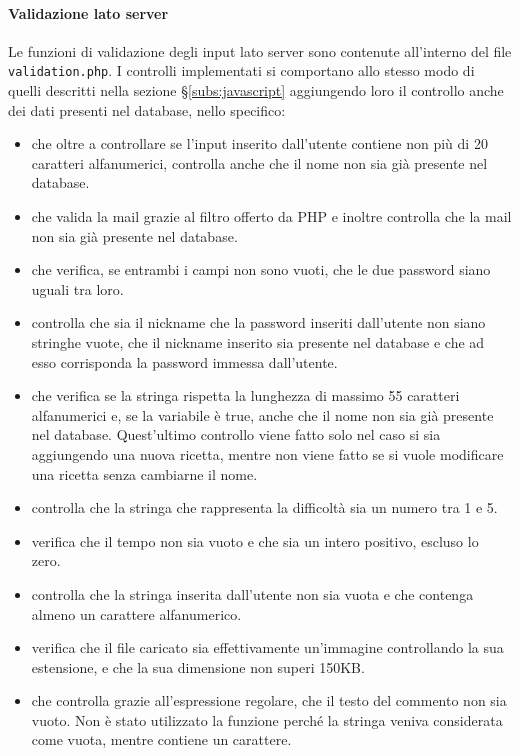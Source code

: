\paragraph{Validazione lato server}\label{par:validazione_lato_server}
Le funzioni di validazione degli input lato server sono contenute all'interno del file \texttt{validation.php}. I controlli implementati si comportano allo stesso modo di quelli descritti nella sezione \S\ref{subs:javascript} aggiungendo loro il controllo anche dei dati presenti nel database, nello specifico:
\begin{itemize}
	\item {} che oltre a controllare se l'input inserito dall'utente contiene non più di 20 caratteri alfanumerici, controlla anche che il nome non sia già presente nel database.
	\item {} che valida la mail grazie al filtro offerto da PHP e inoltre controlla che la mail non sia già presente nel database.
	\item {} che verifica, se entrambi i campi non sono vuoti, che le due password siano uguali tra loro.
	\item {} controlla che sia il nickname che la password inseriti dall'utente non siano stringhe vuote, che il nickname inserito sia presente nel database e che ad esso corrisponda la password immessa dall'utente.
	\item {} che verifica se la stringa rispetta la lunghezza di massimo 55 caratteri alfanumerici e, se la variabile  è true, anche che il nome non sia già presente nel database. Quest'ultimo controllo viene fatto solo nel caso si sia aggiungendo una nuova ricetta, mentre non viene fatto se si vuole modificare una ricetta senza cambiarne il nome.
	\item {} controlla che la stringa che rappresenta la difficoltà sia un numero tra 1 e 5.
	\item {} verifica che il tempo non sia vuoto e che sia un intero positivo, escluso lo zero.
	\item {} controlla che la stringa inserita dall'utente non sia vuota e che contenga almeno un carattere alfanumerico.
	\item {} verifica che il file caricato sia effettivamente un'immagine controllando la sua estensione, e che la sua dimensione non superi 150KB.
	\item {} che controlla grazie all'espressione regolare, che il testo del commento non sia vuoto. Non è stato utilizzato la funzione  perché la stringa  veniva considerata come vuota, mentre contiene un carattere.
\end{itemize}
